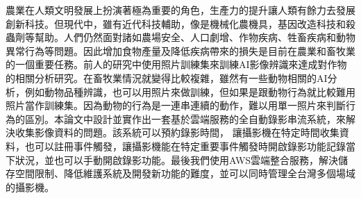 \begin{abstractzh}
\setcounter{page}{2}
農業在人類文明發展上扮演著極為重要的角色，生產力的提升讓人類有餘力去發展創新科技。但現代中，雖有近代科技輔助，像是機械化農機具，基因改造科技和殺蟲劑等幫助。人們仍然面對諸如農場安全、人口劇增、作物疾病、牲畜疾病和動物異常行為等問題。因此增加食物產量及降低疾病帶來的損失是目前在農業和畜牧業的一個重要任務。前人的研究中使用照片訓練集來訓練AI影像辨識來達成對作物的相關分析研究。在畜牧業情況就變得比較複雜，雖然有一些動物相關的AI分析，例如動物品種辨識，也可以用照片來做訓練，但如果是跟動物行為就比較難用照片當作訓練集。因為動物的行為是一連串連續的動作，難以用單一照片來判斷行為的區別。本論文中設計並實作出一套基於雲端服務的全自動錄影串流系統，來解決收集影像資料的問題。該系統可以預約錄影時間，
讓攝影機在特定時間收集資料，也可以註冊事件觸發，讓攝影機能在特定重要事件觸發時開啟錄影功能記錄當下狀況，並也可以手動開啟錄影功能。最後我們使用AWS雲端整合服務，解決儲存空間限制、降低維護系統及開發新功能的難度，並可以同時管理全台灣多個場域的攝影機。

\end{abstractzh}






